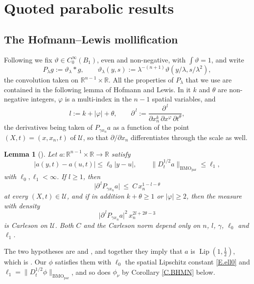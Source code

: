 \documentclass[10pt,a4paper]{amsart}
\numberwithin{equation}{section}
\DeclareMathOperator{\Lip}{Lip}
\newcommand{\R}{\mathbb R}
\newcommand{\abs}[1]{\left\vert#1\right\vert}
\newcommand{\br}[1]{\left(#1\right)}
\newcommand{\pd}{\partial}
\newcommand{\dhalf}{D_t^{1/2}}
\newcommand{\BMOpar}{\mathrm{BMO}_{\mathrm{par}}}
\newcommand{\Uc}{\mathcal U}
\newtheorem{lemma}[equation]{Lemma}
\begin{document}
\section{Quoted parabolic results}\label{S.quoted}

\subsection{The Hofmann--Lewis mollification}\label{ss.moll}

Following \cite[(1.6)]{HLmem} we fix $\vartheta\in C^\infty_0(B_1)$, even and
non-negative, with $\int\vartheta=1$, and write
$$P_\lambda g:=\vartheta_\lambda*g,\qquad
  \vartheta_\lambda(y,s):=\lambda^{-(n+1)}\vartheta\br{y/\lambda,s/\lambda^2},$$
the convolution taken on $\R^{n-1}\times\R$. All the properties of $P_\lambda$
that we use are contained in the following lemma of Hofmann and Lewis. In it
$k$ and $\theta$ are non-negative integers, $\varphi$ is a multi-index in
the $n-1$ spatial variables, and
$$l:=k+\abs\varphi+\theta,\qquad
  \pd^{\,l}:=\frac{\pd^{\,l}}{\pd x_n^k\,\pd x^\varphi\,\pd t^\theta} ,$$
the derivatives being taken of $P_{\gamma x_n}a$ as a function of the point
$(X,t)=(x,x_n,t)$ of $\Uc$, so that $\pd/\pd x_n$ differentiates through the
scale as well.

\begin{lemma}[{\cite[Chapter I, Lemma A]{HLmem}}]\label{L.HL}
Let $a:\R^{n-1}\times\R\to\R$ satisfy
$$\abs{a(y,t)-a(u,t)}\le\ell_0\abs{y-u},\qquad
  \big\|\dhalf a\big\|_{\BMOpar}\le\ell_1 ,$$
with $\ell_0,\ell_1<\infty$. If $l\ge1$, then
\begin{equation}\label{E.mollbds}
  \big|\pd^{\,l}P_{\gamma x_n}a\big|\ \le\ C\,x_n^{1-l-\theta}
\end{equation}
at every $(X,t)\in\Uc$, and if in addition $k+\theta\ge1$ or
$\abs\varphi\ge2$, then the measure with density
\begin{equation}\label{E.mollcarl}
  \big|\pd^{\,l}P_{\gamma x_n}a\big|^2\,x_n^{2l+2\theta-3}
\end{equation}
is Carleson on $\Uc$. Both $C$ and the Carleson norm depend only on $n$, $l$,
$\gamma$, $\ell_0$ and $\ell_1$.
\end{lemma}

\noindent The two hypotheses are \cite[(1.3)]{HLmem} and \cite[(1.4)]{HLmem},
and together they imply that $a$ is $\Lip(1,\tfrac12)$, which is
\cite[(1.5)]{HLmem}. Our $\phi$ satisfies them with $\ell_0$ the spatial
Lipschitz constant \eqref{E.ell0} and $\ell_1=\|\dhalf\phi\|_{\BMOpar}$, and so
does $\phi_\nu$ by Corollary \ref{C.BHMN} below.\medskip
\end{document}
